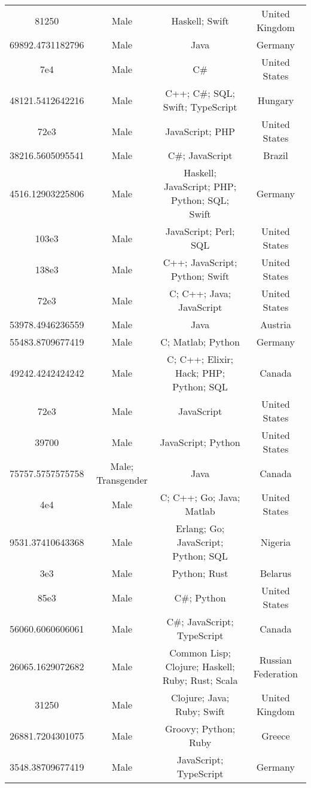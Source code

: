 \begin{center}
\begin{tabular}{ |c|c|c|c| }
81250  &  Male  &  Haskell; Swift  &  United Kingdom  \\ 
69892.4731182796  &  Male  &  Java  &  Germany  \\ 
7e4  &  Male  &  C\#  &  United States  \\ 
48121.5412642216  &  Male  &  C++; C\#; SQL; Swift; TypeScript  &  Hungary  \\ 
72e3  &  Male  &  JavaScript; PHP  &  United States  \\ 
38216.5605095541  &  Male  &  C\#; JavaScript  &  Brazil  \\ 
4516.12903225806  &  Male  &  Haskell; JavaScript; PHP; Python; SQL; Swift  &  Germany  \\ 
103e3  &  Male  &  JavaScript; Perl; SQL  &  United States  \\ 
138e3  &  Male  &  C++; JavaScript; Python; Swift  &  United States  \\ 
72e3  &  Male  &  C; C++; Java; JavaScript  &  United States  \\ 
53978.4946236559  &  Male  &  Java  &  Austria  \\ 
55483.8709677419  &  Male  &  C; Matlab; Python  &  Germany  \\ 
49242.4242424242  &  Male  &  C; C++; Elixir; Hack; PHP; Python; SQL  &  Canada  \\ 
72e3  &  Male  &  JavaScript  &  United States  \\ 
39700  &  Male  &  JavaScript; Python  &  United States  \\ 
75757.5757575758  &  Male; Transgender  &  Java  &  Canada  \\ 
4e4  &  Male  &  C; C++; Go; Java; Matlab  &  United States  \\ 
9531.37410643368  &  Male  &  Erlang; Go; JavaScript; Python; SQL  &  Nigeria  \\ 
3e3  &  Male  &  Python; Rust  &  Belarus  \\ 
85e3  &  Male  &  C\#; Python  &  United States  \\ 
56060.6060606061  &  Male  &  C\#; JavaScript; TypeScript  &  Canada  \\ 
26065.1629072682  &  Male  &  Common Lisp; Clojure; Haskell; Ruby; Rust; Scala  &  Russian Federation  \\ 
31250  &  Male  &  Clojure; Java; Ruby; Swift  &  United Kingdom  \\ 
26881.7204301075  &  Male  &  Groovy; Python; Ruby  &  Greece  \\ 
3548.38709677419  &  Male  &  JavaScript; TypeScript  &  Germany  \\ 

\end{tabular}
\end{center}
